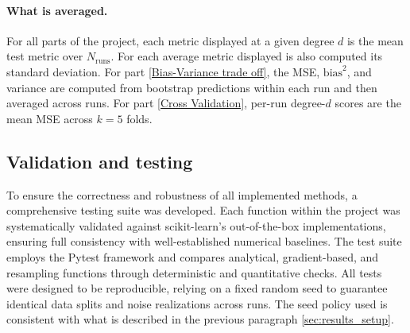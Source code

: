 \documentclass[
 reprint,            %
 amsmath,amssymb,
 aps,
]{revtex4-2}
\begin{document}
\paragraph*{What is averaged.}
For all parts of the project, each metric displayed at a given degree $d$ is the mean test metric over $N_{\text{runs}}$. For each average metric displayed is also computed its standard deviation. 
For part \ref{Bias-Variance trade off}, the MSE, $\mathrm{bias}^2$, and variance are computed from bootstrap predictions within each run and then averaged across runs. For part \ref{Cross Validation}, per-run degree-$d$ scores are the mean MSE across $k=5$ folds.


\subsection*{Validation and testing}
\label{Validation_and_Testing}

To ensure the correctness and robustness of all implemented methods, a comprehensive testing suite was developed. 
Each function within the project was systematically validated against scikit-learn's out-of-the-box implementations, 
ensuring full consistency with well-established numerical baselines. 
The test suite employs the Pytest framework and compares analytical, gradient-based, and resampling functions through deterministic and quantitative checks. 
All tests were designed to be reproducible, relying on a fixed random seed to guarantee identical data splits and noise realizations across runs. 
The seed policy used is consistent with what is described in the previous paragraph \ref{sec:results_setup}.
\end{document}
